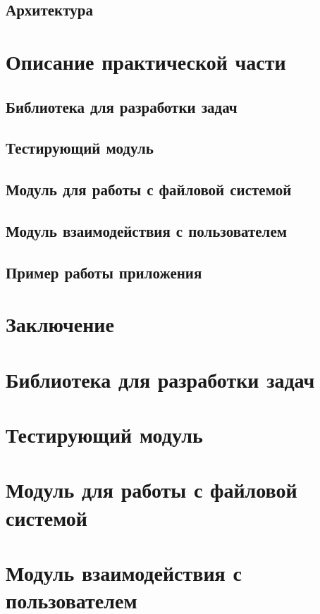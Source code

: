 \section{Архитектура}


\chapter{Описание практической части}
\section{Библиотека для разработки задач}

\section{Тестирующий модуль}

\section{Модуль для работы с файловой системой}

\section{Модуль взаимодействия с пользователем}

\section{Пример работы приложения}


\chapter*{Заключение}




\newpage
\appendix
{}
\footnotesize
\chapter{Библиотека для разработки задач}

\chapter{Тестирующий модуль}

\chapter{Модуль для работы с файловой системой}

\chapter{Модуль взаимодействия с пользователем}


